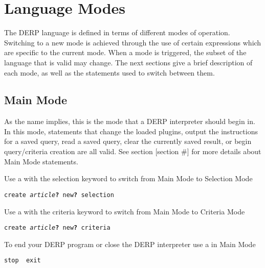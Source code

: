 \section{Language Modes}

The DERP language is defined in terms of different modes of operation.
Switching to a new mode is achieved through the use of certain expressions
which are specific to the current mode. When a mode is triggered, the
subset of the language that is valid may change. The next sections give
a brief description of each mode, as well as the statements used to switch between them.


\subsection{Main Mode}

As the name implies, this is the mode that a DERP interpreter should begin in. In this mode,
statements that change the loaded plugins, output the instructions for a saved query, read a
saved query, clear the currently saved result, or begin query/criteria creation are all valid.
See section [section \#] for more details about Main Mode statements.

Use a  with the selection keyword to switch from Main Mode to Selection Mode\\
\begin{description}[labelindent=1cm,leftmargin=\onelen,labelwidth=1cm]
     \texttt{create \textit{article}\textbf{?} new\textbf{?} selection}\\
\end{description}

Use a  with the criteria keyword to switch from Main Mode to Criteria Mode\\
\begin{description}[labelindent=1cm,leftmargin=\onelen,labelwidth=1cm]
     \texttt{create \textit{article}\textbf{?} new\textbf{?} criteria}\\
\end{description}

To end your DERP program or close the DERP interpreter use a  in Main Mode\\
\begin{description}[labelindent=1cm,leftmargin=\onelen,labelwidth=1cm]
     \texttt{stop \textbf{\textbar} exit}\\
\end{description}

